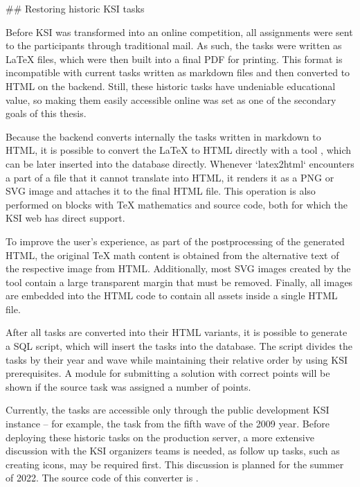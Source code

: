\documentclass[
  digital, %
  oneside, %
  lof,     %
  nolot,     %
]{fithesis4}
\begin{document}
{## Restoring historic KSI tasks

Before KSI was transformed into an online competition, all assignments were sent to the participants through traditional mail. As such, the tasks were written as \LaTeX{} files, which were then built into a final PDF for printing. This format is incompatible with current tasks written as markdown files and then converted to HTML on the backend. Still, these historic tasks have undeniable educational value, so making them easily accessible online	was set as one of the secondary goals of this thesis.

Because the backend converts internally the tasks written in markdown to HTML, it is possible to convert the \LaTeX{} to HTML directly with a tool , which can be later inserted into the database directly. Whenever `latex2html` encounters a part of a file that it cannot translate into HTML, it renders it as a PNG or SVG image and attaches it to the final HTML file. This operation is also performed on blocks with TeX mathematics and source code, both for which the KSI web has direct support.

To improve the user's experience, as part of the postprocessing of the generated HTML, the original TeX math content is obtained from the alternative text of the respective image from HTML. Additionally, most SVG images created by the tool contain a large transparent margin that must be removed. Finally, all images are embedded into the HTML code to contain all assets inside a single HTML file.

After all tasks are converted into their HTML variants, it is possible to generate a SQL script, which will insert the tasks into the database. The script divides the tasks by their year and wave while maintaining their relative order by using KSI prerequisites. A module for submitting a solution with correct points will be shown if the source task was assigned a number of points.

Currently, the tasks are accessible only through the public development KSI instance -- for example, the task  from the fifth wave of the 2009 year. Before deploying these historic tasks on the production server, a more extensive discussion with the KSI organizers teams is needed, as follow up tasks, such as creating icons, may be required first. This discussion is planned for the summer of 2022. The source code of this converter is .

}
\end{document}
